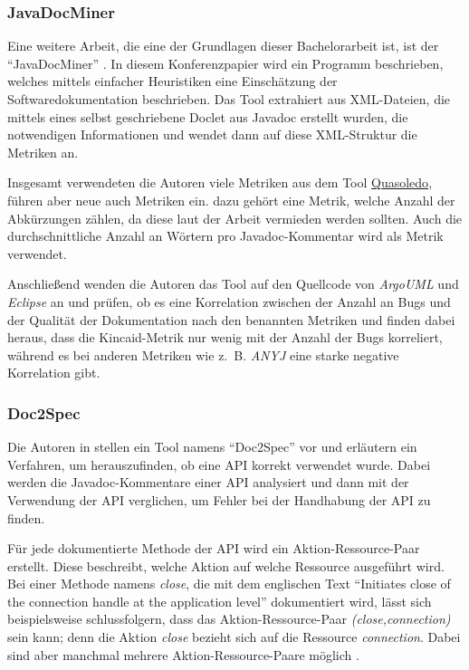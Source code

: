 \subsubsection{JavaDocMiner}
Eine weitere Arbeit, die eine der Grundlagen dieser Bachelorarbeit ist, ist der \enquote{JavaDocMiner} \cite[S. 68-79]{AutomaticQualityAssessmentofSourceCodeComments:TheJavadocMiner}. In diesem Konferenzpapier wird ein Programm beschrieben, welches mittels einfacher Heuristiken eine Einschätzung der Softwaredokumentation beschrieben. Das Tool extrahiert aus XML-Dateien, die mittels eines selbst geschriebene Doclet aus Javadoc erstellt wurden, die notwendigen Informationen und wendet dann auf diese XML-Struktur die Metriken an. 

Insgesamt verwendeten die Autoren viele Metriken aus dem Tool \hyperref[chapter:Quasoledo]{Quasoledo}, führen aber neue auch Metriken ein. dazu gehört eine Metrik, welche Anzahl der Abkürzungen zählen, da diese laut der Arbeit vermieden werden sollten. Auch die durchschnittliche Anzahl an Wörtern pro Javadoc-Kommentar wird als Metrik verwendet. 

Anschließend wenden die Autoren das Tool auf den Quellcode von \textit{ArgoUML} und \textit{Eclipse} an und prüfen, ob es eine Korrelation zwischen der Anzahl an Bugs und der Qualität der Dokumentation nach den benannten Metriken und finden dabei heraus, dass die Kincaid-Metrik nur wenig mit der Anzahl der Bugs korreliert, während es bei anderen Metriken wie z.~B. \textit{ANYJ} eine starke negative Korrelation gibt. 

\subsubsection{Doc2Spec}
Die Autoren in \cite[S. 307ff.]{InferringResourceSpecificationsfromNaturalLanguageAPIDocumentation} stellen ein Tool namens \enquote{Doc2Spec} vor und erläutern ein Verfahren, um herauszufinden, ob eine API korrekt verwendet wurde. Dabei werden die Javadoc-Kommentare einer API analysiert und dann mit der Verwendung der API verglichen, um Fehler bei der Handhabung der API zu finden. 

Für jede dokumentierte Methode der API wird ein Aktion-Ressource-Paar erstellt. Diese beschreibt, welche Aktion auf welche Ressource ausgeführt wird. Bei einer Methode namens \textit{close}, die mit dem englischen Text \enquote{Initiates close of the connection handle at the
application level} dokumentiert wird, lässt sich beispielsweise schlussfolgern, dass das Aktion-Ressource-Paar \textit{(close,connection)} sein kann; denn die Aktion \textit{close} bezieht sich auf die Ressource \textit{connection}. Dabei sind aber manchmal mehrere Aktion-Ressource-Paare möglich \cite[S. 308]{InferringResourceSpecificationsfromNaturalLanguageAPIDocumentation}.

